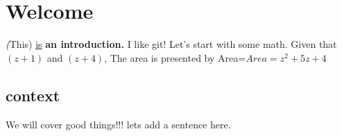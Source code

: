 \documentclass[11pt]{article}
\begin{document}
\section {Welcome}
\textit(This) \underline{is} \textbf{an introduction.} I like git!
Let's start with some math. Given that \((z+1)\) and \((z+4)\),
The area is presented by Area=\(Area=z^2+5z+4\)
\subsection[10]{context} We will cover good things!!!
lets add a sentence here.
\end{document}

